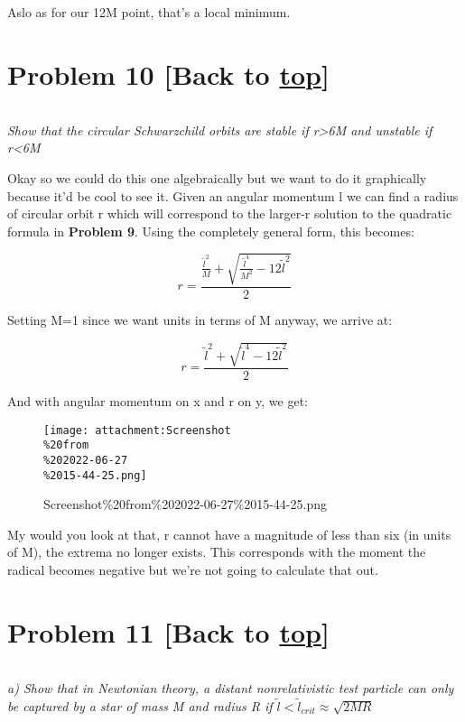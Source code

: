 \documentclass[landscape,letterpaper,10pt,english]{article}
\begin{document}
Aslo as for our 12M point, that's a local minimum.

    \hypertarget{problem-10-back-to-top}{%
\section{\texorpdfstring{Problem 10 {[}Back to
\hyperref[toc]{top}{]}}{Problem 10 {[}Back to {]}}}\label{problem-10-back-to-top}}

\[\label{P10}\]

\emph{Show that the circular Schwarzchild orbits are stable if
r\textgreater6M and unstable if r\textless6M}

Okay so we could do this one algebraically but we want to do it
graphically because it'd be cool to see it. Given an angular momentum l
we can find a radius of circular orbit r which will correspond to the
larger-r solution to the quadratic formula in \textbf{Problem 9}. Using
the completely general form, this becomes:

\[ r = \frac{\frac{\tilde l^2}{M} + \sqrt{\frac{\tilde l^4}{M^2} - 12 \tilde l^2}}{2} \]

    Setting M=1 since we want units in terms of M anyway, we arrive at:

\[ r = \frac{\tilde l^2 + \sqrt{\tilde l^4 - 12 \tilde l^2}}{2} \]

And with angular momentum on x and r on y, we get:

\begin{figure}
\centering
\texttt{[image: attachment:Screenshot\\\%20from\\\%202022-06-27\\\%2015-44-25.png]}
\caption{Screenshot\%20from\%202022-06-27\%2015-44-25.png}
\end{figure}

My would you look at that, r cannot have a magnitude of less than six
(in units of M), the extrema no longer exists. This corresponds with the
moment the radical becomes negative but we're not going to calculate
that out.

    \hypertarget{problem-11-back-to-top}{%
\section{\texorpdfstring{Problem 11 {[}Back to
\hyperref[toc]{top}{]}}{Problem 11 {[}Back to {]}}}\label{problem-11-back-to-top}}

\[\label{P11}\]

\emph{a) Show that in Newtonian theory, a distant nonrelativistic test
particle can only be captured by a star of mass M and radius R if
\(\tilde l < \tilde l_{crit} \approx \sqrt{2MR}\)}
\end{document}
